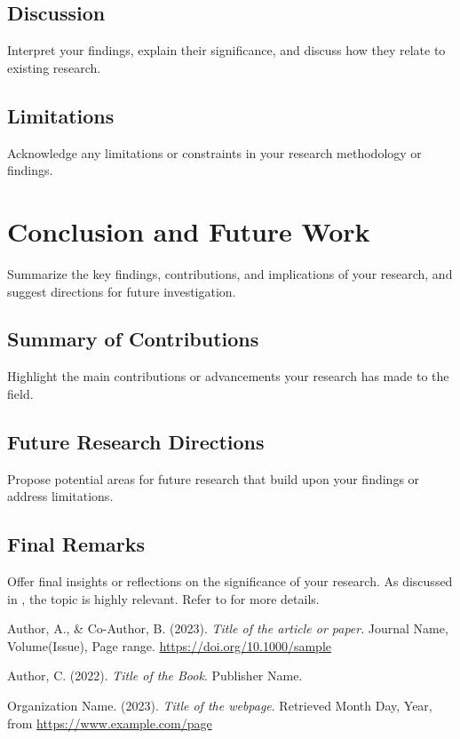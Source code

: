 \documentclass[12pt,a4paper]{report}
\begin{document}
\section{Discussion}
Interpret your findings, explain their significance, and discuss how they relate to existing research.

\section{Limitations}
Acknowledge any limitations or constraints in your research methodology or findings.

\chapter{Conclusion and Future Work}
Summarize the key findings, contributions, and implications of your research, and suggest directions for future investigation.

\section{Summary of Contributions}
Highlight the main contributions or advancements your research has made to the field.

\section{Future Research Directions}
Propose potential areas for future research that build upon your findings or address limitations.

\section{Final Remarks}
Offer final insights or reflections on the significance of your research.
As discussed in \cite{Sample2023}, the topic is highly relevant. Refer to \cite{Book2022} for more details.

\begin{thebibliography}{99}
    Author, A., \& Co-Author, B. (2023). 
    \textit{Title of the article or paper}. 
    Journal Name, Volume(Issue), Page range. 
    \href{https://doi.org/10.1000/sample}{https://doi.org/10.1000/sample}
    
    Author, C. (2022). 
    \textit{Title of the Book}. 
    Publisher Name.
    
    Organization Name. (2023). 
    \textit{Title of the webpage}. 
    Retrieved Month Day, Year, from \url{https://www.example.com/page}
\end{thebibliography}
\end{document}
